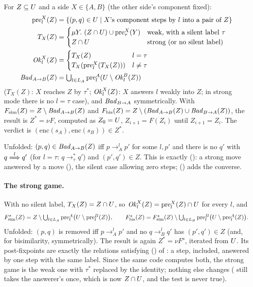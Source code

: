 \begin{definition}
For $Z\subseteq U$ and a side $X\in\{A,B\}$ (the other side's component
fixed):
\begin{align*}
\mathrm{pre}^X_l(Z) &= \{ (p,q)\in U \mid X\text{'s component steps by } l
  \text{ into a pair of } Z\} \\
T_X(Z) &= \begin{cases} \mu Y.\ (Z\cap U) \cup \mathrm{pre}^X_\tau(Y) &
  \text{weak, with a silent label } \tau\\
  Z\cap U & \text{strong (or no silent label)} \end{cases} \\
\mathit{Ok}^X_l(Z) &= \begin{cases} T_X(Z) & l = \tau \\
  T_X(\mathrm{pre}^X_l(T_X(Z))) & l \ne \tau \end{cases}\\
\mathit{Bad}_{A\to B}(Z) &= \textstyle\bigcup_{l\in L_A} \mathrm{pre}^A_l(U \setminus \mathit{Ok}^B_l(Z))
\end{align*}
($T_X(Z)$: $X$ reaches $Z$ by $\tau^\ast$; $\mathit{Ok}^X_l(Z)$: $X$ answers $l$
weakly into $Z$; in strong mode there is no $l=\tau$ case), and
$\mathit{Bad}_{B\to A}$ symmetrically. With $F_{\mathrm{sim}}(Z) = Z\setminus
\mathit{Bad}_{A\to B}(Z)$ and $F_{\mathrm{bis}}(Z) = Z \setminus (\mathit{Bad}_{A\to
B}(Z)\cup\mathit{Bad}_{B\to A}(Z))$, the result is $Z^\ast = \nu F$, computed as
$Z_0 = U$, $Z_{i+1} = F(Z_i)$ until $Z_{i+1} = Z_i$. The verdict is
$(\mathrm{enc}(s_A),\mathrm{enc}(s_B)) \in Z^\ast$.
\end{definition}

Unfolded: $(p,q)\in\mathit{Bad}_{A\to B}(Z)$ iff $p\to^l_A p'$ for some $l, p'$
and there is no $q'$ with $q \stackrel{l}{\Longrightarrow} q'$ (for $l=\tau$: $q\to_\tau^\ast
q'$) and $(p',q')\in Z$. This is exactly 
(): a strong move answered by a
 move (), the silent
case allowing zero steps; 
() adds the converse.

\paragraph{The strong game.} With no silent label, $T_X(Z) = Z\cap U$, so
$\mathit{Ok}^X_l(Z) = \mathrm{pre}^X_l(Z)\cap U$ for every $l$, and
\[
F^{s}_{\mathrm{sim}}(Z) = Z \setminus \textstyle\bigcup_{l\in L_A}
  \mathrm{pre}^A_l\bigl(U\setminus\mathrm{pre}^B_l(Z)\bigr),
\qquad
F^{s}_{\mathrm{bis}}(Z) = F^{s}_{\mathrm{sim}}(Z) \setminus
  \textstyle\bigcup_{l\in L_B}\mathrm{pre}^B_l\bigl(U\setminus\mathrm{pre}^A_l(Z)\bigr).
\]
Unfolded: $(p,q)$ is removed iff $p\to^l_A p'$ and no $q\to^l_B q'$ has
$(p',q')\in Z$ (and, for bisimilarity, symmetrically). The result is again
$Z^\ast = \nu F^{s}$, iterated from $U$. Its post-fixpoints are exactly
the relations satisfying  () of
: a step,  included,
answered by one step with the same label. Since the same code computes both,
the strong game is the weak one with $\tau^\ast$ replaced by the identity;
nothing else changes ( still takes the answerer's
 once, which is now $Z\cap U$, and the test
 is never true).

